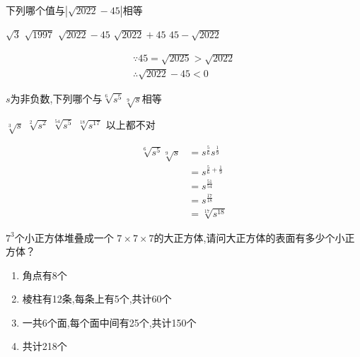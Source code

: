 \documentclass[answers]{exam}
\begin{document}
\begin{questions}
	\question 下列哪个值与$|\sqrt{2022} - 45|$相等

	\begin{oneparchoices}
		\choice $\sqrt{3}$ \choice $\sqrt{1997}$ \choice $\sqrt{2022} - 45$ \choice $\sqrt{2022} + 45$ \CorrectChoice $45 - \sqrt{2022}$
	\end{oneparchoices}

	\begin{solution}
		\begin{gather*}
			\because 45 = \sqrt{2025} > \sqrt{2022} \\
			\therefore \sqrt{2022} - 45 < 0
		\end{gather*}
	\end{solution}

	\question $s$为非负数,下列哪个与$\sqrt[6]{s^5}\sqrt[9]{s}$相等

	\begin{oneparchoices}
		\choice $\sqrt[3]{s}$ \choice $\sqrt[2]{s^2}$ \choice $\sqrt[54]{s^5}$ \CorrectChoice $\sqrt[18]{s^{17}}$ \choice 以上都不对
	\end{oneparchoices}

	\begin{solution}
		\begin{align*}
			\sqrt[6]{s^5}\sqrt[9]{s} & = s^{\frac{5}{6}}s^{\frac{1}{9}} \\
			                         & = s^{\frac{5}{6} + \frac{1}{9}}  \\
			                         & = s^{\frac{51}{54}}              \\
			                         & = s^{\frac{17}{18}}              \\
			                         & = \sqrt[17]{s^{18}}
		\end{align*}
	\end{solution}

	\question \( 7^3 \)个小正方体堆叠成一个 \( 7 \times 7 \times 7 \)的大正方体,请问大正方体的表面有多少个小正方体？

	\begin{oneparchoices}
		    \choice 327
	\end{oneparchoices}

	\begin{solution}
		\begin{enumerate}
			\item 角点有8个
			\item 棱柱有12条,每条上有5个,共计60个
			\item 一共6个面,每个面中间有25个,共计150个
			\item 共计218个
		\end{enumerate}


\end{solution}
\end{questions}
\end{document}
